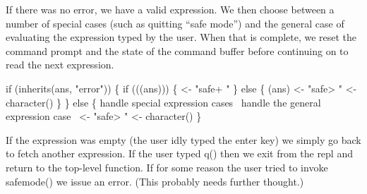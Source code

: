 \documentclass[a4paper]{article}%
\begin{document}
If there was no error, we have a valid expression.  
We then choose between a number of special cases
(such as quitting ``safe mode'') and the general case of
evaluating the expression typed by the user.  When that is complete,
we reset the command prompt and the state of the command buffer before
continuing on to read the next expression.

\nwenddocs{}\endmoddef\nwstartdeflinemarkup{}\nwenddeflinemarkup
if (inherits(ans, "error")) \{
    if (((ans))) \{
         <- "safe+ "
    \} else \{
        (ans)
         <- "safe> "
         <- character()
    \}
\} else \{
    \LA{}handle special expression cases~{\nwtagstyle{}}\RA{}
    \LA{}handle the general expression case~{\nwtagstyle{}}\RA{}
     <- "safe> "
     <- character()
\}
\nwendcode{}\nwdocspar

If the expression was empty (the user idly typed the enter key) we
simply go back to fetch another expression.  If the user typed {\Tt{}q()\nwendquote}
then we exit from the repl and return to the top-level function.  If
for some reason the user tried to invoke {\Tt{}safemode()\nwendquote} 
we issue an error.  (This probably needs
further thought.)
\end{document}
